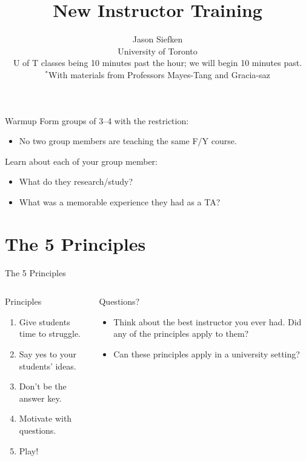 \documentclass[10pt, aspectratio=169, t]{beamer}
\title{New Instructor Training}
\subtitle{}
\author{{\large Jason Siefken}\\
University of Toronto\\[1cm]
\textcolor{mLightBrown}{U of T classes being 10 minutes past the hour; we will begin 10 minutes past.}\\[2cm]$^*$With materials from Professors Mayes-Tang and Gracia-saz}
\date{}
\begin{document}

\maketitle


%
\begin{frame}{Warmup}
	Form groups of 3--4 with the restriction:
	\begin{itemize}
		\item No two group members are teaching the same F/Y course.
	\end{itemize}

	Learn about each of your group member:
	\begin{itemize}
		\item What do they research/study?
		\item What was a memorable experience they had as a TA?
	\end{itemize}
\end{frame}

\section{The 5 Principles}
\begin{frame}{The 5 Principles}
\begin{columns}
\begin{column}{0.5\textwidth}
	\begin{block}{Principles}
		\begin{enumerate}
			\item Give students time to struggle.
			\item Say yes to your students' ideas.
			\item Don't be the answer key.
			\item Motivate with questions.
			\item Play!
		\end{enumerate}
	\end{block}
\end{column}
\begin{column}{0.5\textwidth}  %
	\begin{block}{Questions?}
		\begin{itemize}
			\item Think about the best instructor you ever had. Did any of the principles apply to them?
			\item Can these principles apply in a university setting?
		\end{itemize}
	\end{block}
\end{column}
\end{columns}
\end{frame}
\end{document}
